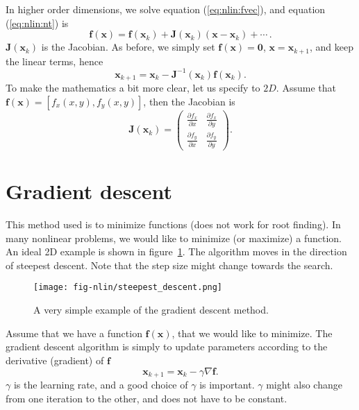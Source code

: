\documentclass[graybox,sectrefs,envcountresetchap,open=right,final]{svmonodo}
\begin{document}
In higher order dimensions, we solve equation (\ref{eq:nlin:fvec}), and equation (\ref{eq:nlin:nt}) is
\begin{equation}
\mathbf{f}(\mathbf{x})=\mathbf{f}(\mathbf{x}_k)+ \mathbf{J}(\mathbf{x}_k)(\mathbf{x}-\mathbf{x}_k) + \cdots\,.
\label{eq:nlin:ntd}
\end{equation}
$\mathbf{J}(\mathbf{x}_k)$ is the Jacobian. As before, we simply set  $\mathbf{f}(\mathbf{x})=\mathbf{0}$, $\mathbf{x}=\mathbf{x}_{k+1}$, and keep the linear terms, hence
\begin{equation}
\mathbf{x}_{k+1}=\mathbf{x}_k-\mathbf{J}^{-1}(\mathbf{x}_k)\mathbf{f}(\mathbf{x}_k). 
\label{eq:nlin:ntd2}
\end{equation}
To make the mathematics a bit more clear, let us specify to $2D$. Assume that
$\mathbf{f}(\mathbf{x})=[f_x(x,y),f_y(x,y)]$, then the Jacobian is
\begin{equation}
\mathbf{J}(\mathbf{x}_k)=
\left(
\begin{array}{cc}
\frac{\partial f_x}{\partial x}&\frac{\partial f_x}{\partial y}\\ 
\frac{\partial f_y}{\partial x}&\frac{\partial f_y}{\partial y}
\end{array}
\right).
\label{eq:nlin:jac}
\end{equation}

\section{Gradient descent}
This method used is to minimize functions (does not work for root finding). In many nonlinear problems, we would like to minimize (or maximize) a function. An ideal 2D example is shown in figure~\ref{fig:nlin:grad}. The algorithm moves in the direction of steepest descent. Note that the step size might change towards the search. 

\begin{figure}[!ht]  %
  \centerline{\texttt{[image: fig-nlin/steepest\_descent.png]}}
  \caption{
  A very simple example of the gradient descent method. \label{fig:nlin:grad}
  }
\end{figure}

Assume that we have a function $\mathbf{f}(\mathbf{x})$, that we would like to minimize. The gradient descent algorithm is simply to update parameters according to the derivative (gradient) of $\mathbf{f}$
\begin{equation}
\mathbf{x}_{k+1}=\mathbf{x}_{k}-\gamma\nabla\mathbf{f}.
\label{eq:nlin:stpdc}
\end{equation}
$\gamma$ is the learning rate, and a good choice of $\gamma$ is important. $\gamma$ might also change from one iteration to the other, and does not have to be constant.  
\end{document}
